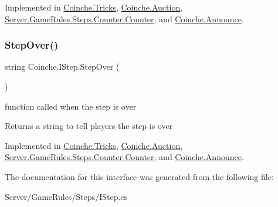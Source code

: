 Implemented in \hyperlink{class_coinche_1_1_tricks_ade6668950abaf544373d90516821eab1}{Coinche.\+Tricks}, \hyperlink{class_coinche_1_1_auction_ae6b090721adfc333705f5f79ca9b462a}{Coinche.\+Auction}, \hyperlink{class_server_1_1_game_rules_1_1_steps_1_1_counter_1_1_counter_a7e681c51f20d2509e0b53dede3d73dc0}{Server.\+Game\+Rules.\+Steps.\+Counter.\+Counter}, and \hyperlink{class_coinche_1_1_announce_a0fddda733e5f081be1091b2c67279982}{Coinche.\+Announce}.

\mbox{\label{interface_coinche_1_1_i_step_a86ef55b4c36ffa27f5fa18a10e9a61a0}} 
\subsubsection{\texorpdfstring{Step\+Over()}{StepOver()}}
{\footnotesize\ttfamily string Coinche.\+I\+Step.\+Step\+Over (\begin{DoxyParamCaption}{ }\end{DoxyParamCaption})}



function called when the step is over 

\begin{DoxyReturn}{Returns}
a string to tell players the step is over
\end{DoxyReturn}


Implemented in \hyperlink{class_coinche_1_1_tricks_afa44486bcd0e3ce034330d8c0f0d36eb}{Coinche.\+Tricks}, \hyperlink{class_coinche_1_1_auction_ab1621fd742e17a9814671116d4d0682c}{Coinche.\+Auction}, \hyperlink{class_server_1_1_game_rules_1_1_steps_1_1_counter_1_1_counter_a75247ce8610225edadc753a432dd9c56}{Server.\+Game\+Rules.\+Steps.\+Counter.\+Counter}, and \hyperlink{class_coinche_1_1_announce_a3337d94429e31a70eb66ee0be3714e86}{Coinche.\+Announce}.



The documentation for this interface was generated from the following file\+:\begin{DoxyCompactItemize}
\item 
Server/\+Game\+Rules/\+Steps/I\+Step.\+cs\end{DoxyCompactItemize}
